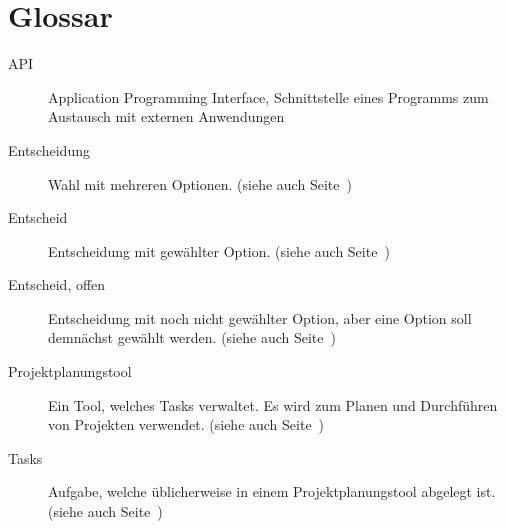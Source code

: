 \chapter{Glossar}
	\begin{description}
		\item[API]{Application Programming Interface, Schnittstelle eines Programms zum Austausch mit externen Anwendungen}
		\item[Entscheidung]{Wahl mit mehreren Optionen. (siehe auch Seite~\pageref{userstoryDefinitions})}
		\item[Entscheid]{Entscheidung mit gewählter Option. (siehe auch Seite~\pageref{userstoryDefinitions})}
		\item[Entscheid, offen]{Entscheidung mit noch nicht gewählter Option, aber eine Option soll demnächst gewählt werden. (siehe auch Seite~\pageref{userstoryDefinitions})}
		\item[Projektplanungstool]{Ein Tool, welches Tasks verwaltet. Es wird zum Planen und Durchführen von Projekten verwendet. (siehe auch Seite~\pageref{userstoryDefinitions})}
		\item[Tasks]{Aufgabe, welche üblicherweise in einem Projektplanungstool abgelegt ist. (siehe auch Seite~\pageref{userstoryDefinitions})}
	\end{description}